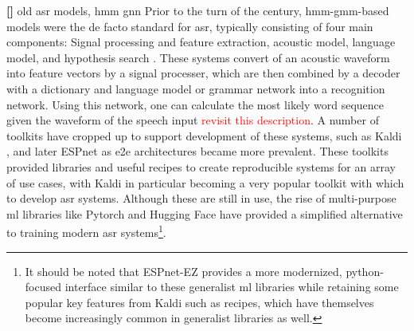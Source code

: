 \documentclass[thesis]{cluu}
\newcounter{paranum}
\newcommand{\numberedparagraph}{\par\refstepcounter{paranum}\textbf{[\theparanum] }}
\newcommand{\todo}[1]{\textcolor{red}{#1}}
\begin{document}
\numberedparagraph{old asr models, hmm gnn}
Prior to the turn of the century, \gls{hmm}-\gls{gmm}-based models were the de facto standard for \gls{asr}, typically consisting of four main components: Signal processing and feature extraction, acoustic model, language model, and hypothesis search \parencite{yuAutomaticSpeechRecognition2015}. These systems convert of an acoustic waveform into feature vectors by a signal processer, which are then combined by a decoder with a dictionary and language model or grammar network into a recognition network. Using this network, one can calculate the most likely word sequence given the waveform of the speech input \parencite{witt2000use} \todo{revisit this description}. A number of toolkits have cropped up to support development of these systems, such as Kaldi \parencite{poveyKaldiSpeechRecognition}, and later ESPnet \parencite{watanabeESPnetEndtoEndSpeech2018} as \gls{e2e} architectures became more prevalent. These toolkits provided libraries and useful recipes to create reproducible systems for an array of use cases, with Kaldi in particular becoming a very popular toolkit with which to develop \gls{asr} systems. Although these are still in use, the rise of multi-purpose \gls{ml} libraries like Pytorch \parencite{paszkePyTorchImperativeStyle2019} and Hugging Face \parencite{wolfTransformersStateoftheArtNatural2020} have provided a simplified alternative to training modern \gls{asr} systems\footnote{It should be noted that ESPnet-EZ \parencite{somekiESPnetEZPythononlyESPnet2024} provides a more modernized, python-focused interface similar to these generalist \gls{ml} libraries while retaining some popular key features from Kaldi such as recipes, which have themselves become increasingly common in generalist libraries as well.}. 
\end{document}
